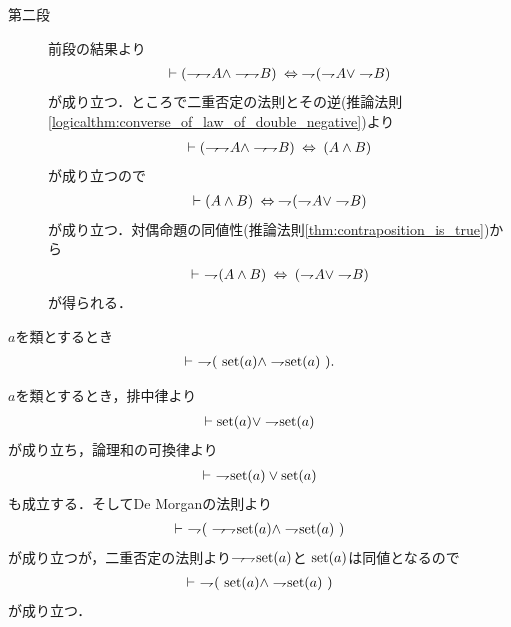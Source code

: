 \begin{prf}
\begin{description}
			\item[第二段]
				前段の結果より
				\begin{align}
					\vdash (\negation \negation A \wedge \negation \negation B)
					\lrarrow \negation (\negation A \vee \negation B)
				\end{align}
				が成り立つ．ところで二重否定の法則とその逆(推論法則\ref{logicalthm:converse_of_law_of_double_negative})より
				\begin{align}
					\vdash (\negation \negation A \wedge \negation \negation B)
					\lrarrow (A \wedge B)
				\end{align}
				が成り立つので
				\begin{align}
					\vdash (A \wedge B) 
					\lrarrow \negation (\negation A \vee \negation B)
				\end{align}
				が成り立つ．対偶命題の同値性(推論法則\ref{thm:contraposition_is_true})から
				\begin{align}
					\vdash\ \negation (A \wedge B)
					\lrarrow (\negation A \vee \negation B)
				\end{align}
				が得られる．
				\QED
		\end{description}
	\end{prf}
	
	
	\begin{screen}
		\begin{thm}[集合であり真類でもある類は存在しない]
			$a$を類とするとき
			\begin{align}
				\vdash\ \negation (\ \set{a} \wedge \negation \set{a}\ ).
			\end{align}
		\end{thm}
	\end{screen}
	
	\begin{prf}
		$a$を類とするとき，排中律より
		\begin{align}
			\vdash \set{a} \vee \negation \set{a}
		\end{align}
		が成り立ち，論理和の可換律より
		\begin{align}
			\vdash\ \negation \set{a} \vee \set{a}
		\end{align}
		も成立する．そしてDe Morganの法則より
		\begin{align}
			\vdash\ \negation (\ \negation \negation \set{a} \wedge \negation \set{a}\ )
		\end{align}
		が成り立つが，二重否定の法則より$\negation \negation \set{a}$と
		$\set{a}$は同値となるので
		\begin{align}
			\vdash\ \negation (\ \set{a} \wedge \negation \set{a}\ )
		\end{align}
		が成り立つ．
		\QED
	\end{prf}
	
